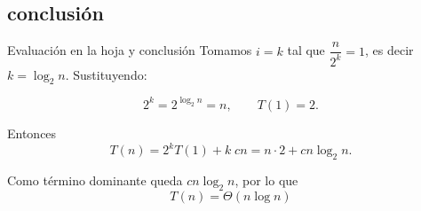 \documentclass{beamer}
\begin{document}
\subsection{conclusión}
\begin{frame}{Evaluación en la hoja y conclusión}
Tomamos \(i=k\) tal que \(\dfrac{n}{2^{k}}=1\), es decir \(k=\log_2 n\). Sustituyendo:

\[
2^{k}=2^{\log_2 n}=n,\qquad T(1)=2.
\]

Entonces
\[
T(n)=2^{k}T(1) + k\; c n = n\cdot 2 + c n \log_2 n.
\]

Como término dominante queda \(c n \log_2 n\), por lo que
\[
\boxed{\,T(n)=\Theta(n\log n)\,}
\]


\end{frame}
\end{document}
